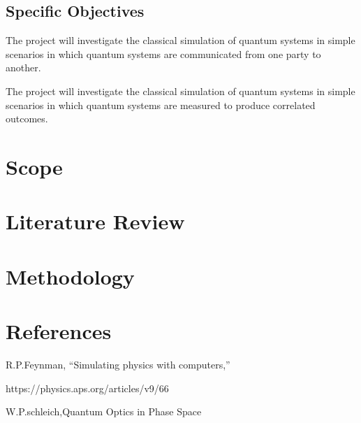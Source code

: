 \documentclass[options]{article}
\begin{document}
\subsection{Specific Objectives}
The project will investigate the classical simulation of quantum systems in simple scenarios in which quantum systems are communicated from one party to another. 

The project will investigate the classical simulation of quantum systems in simple scenarios in which quantum systems are measured to produce correlated outcomes. 

\section {\textbf{Scope}}

\section{\textbf{Literature Review }}


\section {\textbf{Methodology}}

\section{\textbf{References}}
R.P.Feynman, “Simulating physics with computers,”

https://physics.aps.org/articles/v9/66 

W.P.schleich,Quantum Optics in Phase Space 
\end{document}
